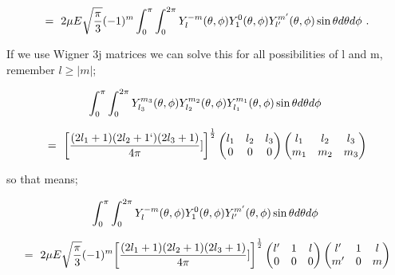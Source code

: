 \documentclass{article}
\begin{document}
\begin{equation} \label{rotor-eq-261-1}
= \hspace{0.125cm} 2 \mu E \sqrt{\frac{\pi}{3}} (-1)^{m} \int_{0}^{\pi} \int_{0}^{2\pi} Y_{l}^{-m}(\theta, \phi) Y_{1}^{0}(\theta, \phi) Y_{l'}^{m'}(\theta, \phi) \sin\theta d\theta d\phi \hspace{0.125cm} . 
\end{equation}

If we use Wigner 3j matrices we can solve this for all possibilities of l and m, remember \begin{math} l \ge \big| m \big| \end{math};

\begin{equation} \label{rotor-eq-262-1}
\int_{0}^{\pi} \int_{0}^{2\pi} Y_{l_{3}}^{m_{3}}(\theta, \phi) Y_{l_{2}}^{m_{2}}(\theta, \phi) Y_{l_{1}}^{m_{1}}(\theta, \phi) \sin\theta d\theta d\phi \hspace{0.125cm} 
\end{equation}

\begin{equation} \label{rotor-eq-263-1}
= \hspace{0.125cm} \bigg[\frac{(2 l_1 + 1)(2 l_2 + 1`)(2 l_3 + 1)}{4\pi}]\bigg]^{\frac{1}{2}}\begin{pmatrix} l_1 & l_2 & l_3 \\ 0 & 0 & 0 \end{pmatrix}\begin{pmatrix} l_1 & l_2 & l_3 \\ m_1 & m_2 & m_3 \end{pmatrix}
\end{equation}

so that means;

\begin{equation} \label{rotor-eq-264-1}
\int_{0}^{\pi} \int_{0}^{2\pi} Y_{l}^{-m}(\theta, \phi) Y_{1}^{0}(\theta, \phi) Y_{l'}^{m'}(\theta, \phi) \sin\theta d\theta d\phi \hspace{0.125cm} 
\end{equation}

\begin{equation} \label{rotor-eq-265-1}
= \hspace{0.125cm} 2 \mu E \sqrt{\frac{\pi}{3}} (-1)^{m} \bigg[\frac{(2 l_1 + 1)(2 l_2 + 1)(2 l_3 + 1)}{4\pi}]\bigg]^{\frac{1}{2}}\begin{pmatrix} l' & 1 & l \\ 0 & 0 & 0 \end{pmatrix}\begin{pmatrix} l' & 1 & l \\ m' & 0 & m \end{pmatrix}
\end{equation}
\end{document}
